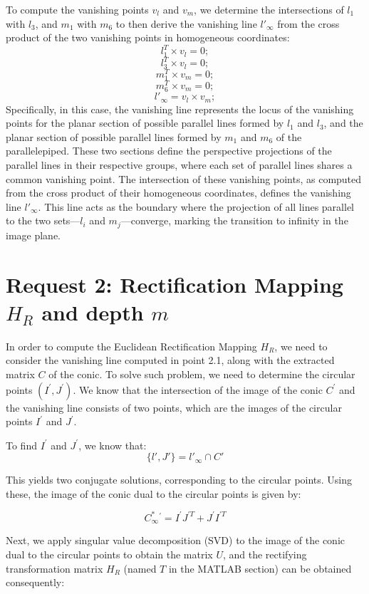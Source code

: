 \documentclass{Configuration_Files/PoliMi3i_thesis}
\begin{document}
\noindent
To compute the vanishing points \( v_l \) and \( v_m \), we determine the intersections of \( l_1 \) with \( l_3 \), and \( m_1 \) with \( m_6 \) to then derive the vanishing line \( l'_\infty \) from the cross product of the two vanishing points in homogeneous coordinates:
\[
l_1^T \times v_l = 0;  
\]
\[
l_3^T \times v_l = 0;  
\]
\[
m_1^T \times v_m = 0;  
\]
\[
m_6^T \times v_m = 0;  
\]
\[
l'_\infty = v_l \times v_m;  
\]
Specifically, in this case, the vanishing line represents the locus of the vanishing points for the planar section of possible parallel lines formed by \( l_1 \) and \( l_3 \), and the planar section of possible parallel lines formed by \( m_1 \) and \( m_6 \) of the parallelepiped. These two sections define the perspective projections of the parallel lines in their respective groups, where each set of parallel lines shares a common vanishing point. The intersection of these vanishing points, as computed from the cross product of their homogeneous coordinates, defines the vanishing line \( l'_\infty \). This line acts as the boundary where the projection of all lines parallel to the two sets—\( l_i \) and \( m_j \)—converge, marking the transition to infinity in the image plane. 

\newpage
\section{Request 2: Rectification Mapping \( H_R \) and depth \(m\)}

\noindent
In order to compute the Euclidean Rectification Mapping $H_R$, we need to consider the vanishing line computed in point 2.1, along with the extracted matrix $C$ of the conic. To solve such problem, we need to determine the circular points \((I^{\prime}, J^{\prime})\). We know that the intersection of the image of the conic \(C^{\prime}\) and the vanishing line consists of two points, which are the images of the circular points \(I^{\prime}\) and \(J^{\prime}\).

\noindent
To find \(I^{\prime}\) and \(J^{\prime}\), we know that:
\[
\{l', J'\} = l'_{\infty} \cap C'
\]

\noindent
This yields two conjugate solutions, corresponding to the circular points. Using these, the image of the conic dual to the circular points is given by:

\[
C^{*}_{\infty}{}^{\prime} = I^{\prime}J^{\prime T} + J^{\prime}I^{\prime T}  
\]

\noindent
Next, we apply singular value decomposition (SVD) to the image of the conic dual to the circular points to obtain the matrix \(U\), and the rectifying transformation matrix \(H_{R}\) (named $T$ in the MATLAB section) can be obtained consequently:
\end{document}

